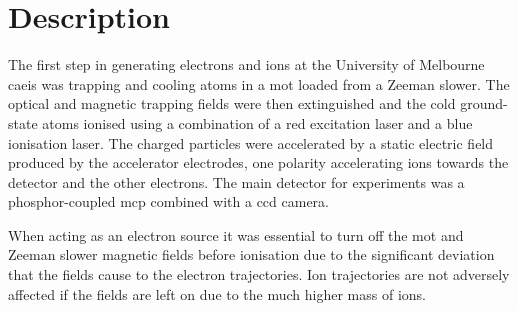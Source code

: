 \section{Description}
The first step in generating electrons and ions at the University of Melbourne \gls{caeis} was trapping and cooling atoms in a \gls{mot} loaded from a Zeeman slower.
The optical and magnetic trapping fields were then extinguished and the cold ground-state atoms ionised using a combination of a red excitation laser and a blue ionisation laser.
The charged particles were accelerated by a static electric field produced by the accelerator electrodes, one polarity accelerating ions towards the detector and the other electrons.
The main detector for experiments was a phosphor-coupled \gls{mcp} combined with a \gls{ccd} camera.

When acting as an electron source it was essential to turn off the \gls{mot} and Zeeman slower magnetic fields before ionisation due to the significant deviation that the fields cause to the electron trajectories.
Ion trajectories are not adversely affected if the fields are left on due to the much higher mass of ions.

